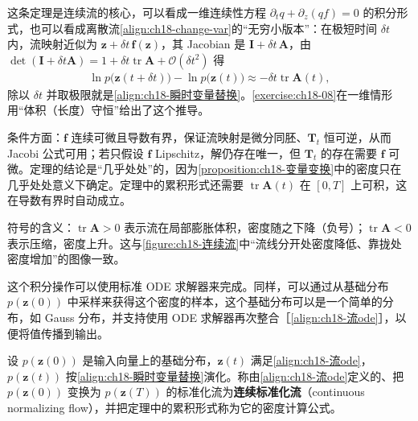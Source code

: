 \documentclass[../../main.tex]{subfiles}
\begin{document}
\begin{remark}
这条定理是连续流的核心，可以看成一维连续性方程 $\partial_t q+\partial_z(qf)=0$ 的积分形式，也可以看成离散流\eqref{align:ch18-change-var}的“无穷小版本”：在极短时间 $\delta t$ 内，流映射近似为 $\bm{z}+\delta t\,\bm{f}(\bm{z})$，其 Jacobian 是 $\bm{I}+\delta t\,\bm{A}$，由 $\det(\bm{I}+\delta t\bm{A})=1+\delta t\operatorname{tr}\bm{A}+\mathcal{O}(\delta t^{2})$ 得
\begin{align*}
  \ln p\big(\bm{z}(t+\delta t)\big)-\ln p\big(\bm{z}(t)\big)\approx-\delta t\operatorname{tr}\bm{A}(t),
\end{align*}
除以 $\delta t$ 并取极限就是\eqref{align:ch18-瞬时变量替换}。\cref{exercise:ch18-08}在一维情形用“体积（长度）守恒”给出了这个推导。

条件方面：$\bm{f}$ 连续可微且导数有界，保证流映射是微分同胚、$\bm{T}_t$ 恒可逆，从而 Jacobi 公式可用；若只假设 $\bm{f}$ Lipschitz，解仍存在唯一，但 $\bm{T}_t$ 的存在需要 $\bm{f}$ 可微。定理的结论是“几乎处处”的，因为\cref{proposition:ch18-变量变换}中的密度只在几乎处处意义下确定。定理中的累积形式还需要 $\operatorname{tr}\bm{A}(t)$ 在 $[0,T]$ 上可积，这在导数有界时自动成立。

符号的含义：$\operatorname{tr}\bm{A}>0$ 表示流在局部膨胀体积，密度随之下降（负号）；$\operatorname{tr}\bm{A}<0$ 表示压缩，密度上升。这与\cref{figure:ch18-连续流}中“流线分开处密度降低、靠拢处密度增加”的图像一致。
\end{remark}

这个积分操作可以使用标准 ODE 求解器来完成。同样，可以通过从基础分布 $p(\bm{z}(0))$ 中采样来获得这个密度的样本，这个基础分布可以是一个简单的分布，如 Gauss 分布，并支持使用 ODE 求解器再次整合［\eqref{align:ch18-流ode}］，以便将值传播到输出。

\begin{definition}[连续标准化流]\label{definition:ch18-连续标准化流}
设 $p(\bm{z}(0))$ 是输入向量上的基础分布，$\bm{z}(t)$ 满足\eqref{align:ch18-流ode}，$p(\bm{z}(t))$ 按\eqref{align:ch18-瞬时变量替换}演化。称由\eqref{align:ch18-流ode}定义的、把 $p(\bm{z}(0))$ 变换为 $p(\bm{z}(T))$ 的标准化流为\textbf{连续标准化流}（continuous normalizing flow），并把定理中的累积形式称为它的密度计算公式。
\end{definition}
\end{document}
